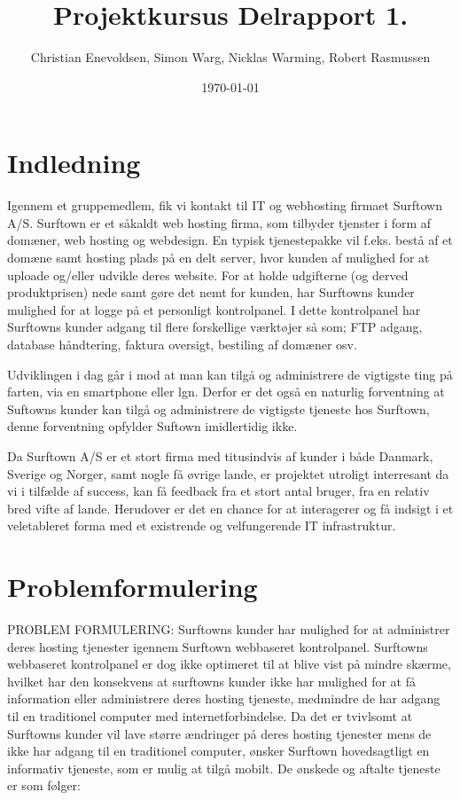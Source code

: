 \documentclass[]{article}
\begin{document}
\title{Projektkursus Delrapport 1.}
\author{Christian Enevoldsen, Simon Warg, Nicklas Warming, Robert Rasmussen}
\date{\today}
\maketitle

\section*{Indledning}

Igennem et gruppemedlem, fik vi kontakt til IT og webhosting firmaet Surftown A/S. Surftown er et såkaldt web hosting firma, som tilbyder tjenster i form af domæner, web hosting og webdesign. En typisk tjenestepakke vil f.eks. bestå af et domæne samt hosting plads på en delt server, hvor kunden af mulighed for at uploade og/eller udvikle deres website. For at holde udgifterne (og derved produktprisen) nede samt gøre det nemt for kunden, har Surftowns kunder mulighed for at logge på et personligt kontrolpanel. I dette kontrolpanel har Surftowns kunder adgang til flere forskellige værktøjer så som; FTP adgang, database håndtering, faktura oversigt, bestiling af domæner osv.

Udviklingen i dag går i mod at man kan tilgå og administrere de vigtigste ting på farten, via en smartphone eller lgn. Derfor er det også en naturlig forventning at Suftowns kunder kan tilgå og administrere de vigtigste tjeneste hos Surftown, denne forventning opfylder Suftown imidlertidig ikke.

Da Surftown A/S er et stort firma med titusindvis af kunder i både Danmark, Sverige og Norger, samt nogle få øvrige lande, er projektet utroligt interresant da vi i tilfælde af success, kan få feedback fra et stort antal bruger, fra en relativ bred vifte af lande. Herudover er det en chance for at interagerer og få indsigt i et veletableret forma med et existrende og velfungerende IT infrastruktur.

\section*{Problemformulering}

PROBLEM FORMULERING:
Surftowns kunder har mulighed for at administrer deres hosting tjenester igennem Surftown webbaseret kontrolpanel. Surftowns webbaseret kontrolpanel er dog ikke optimeret til at blive vist på mindre skærme, hvilket har den konsekvens at surftowns kunder ikke har mulighed for at få information eller administrere deres hosting tjeneste, medmindre de har adgang til en traditionel computer med internetforbindelse. Da det er tvivlsomt at Surftowns kunder vil lave større ændringer på deres hosting tjenester mens de ikke har adgang til en traditionel computer, ønsker Surftown hovedsagtligt en informativ tjeneste, som er mulig at tilgå mobilt. De ønskede og aftalte tjeneste er som følger:
\end{document}
